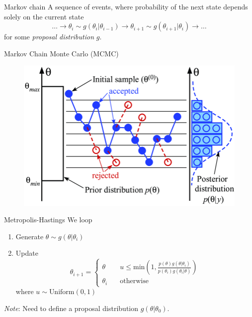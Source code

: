 \documentclass[
aspectratio=169,
14pt,
professionalfonts
]{beamer}
\begin{document}
\begin{frame}{Markov chain}
    A sequence of events, where probability of the next state depends solely on the current state
    $$
    \ldots \to \theta_{i} \sim g(\theta_{i} | \theta_{i-1}) \to \theta_{i+1} \sim g(\theta_{i+1} | \theta_{i}) \to \ldots
    $$
    for some \textit{proposal distribution} $g$. 
\end{frame}

\begin{frame}{Markov Chain Monte Carlo (MCMC)}
    \begin{figure}
        \centering
        \includegraphics[width=0.6\linewidth]{../plots/mcmc_diagram.png}
    \end{figure}
\end{frame}

\begin{frame}{Metropolis-Hastings}
We loop
\begin{enumerate}
    \item Generate $\theta \sim g(\theta|\theta_i)$
    \item Update
    \begin{equation*}
        \theta_{i+1} =
        \begin{cases}
            \theta  &\quad u \leq \text{min}\left(1, \frac{p(\theta)g(\theta|\theta_i)}{p(\theta_i)g(\theta_i|\theta)}\right)\\
            \theta_i &\quad \text{otherwise}
        \end{cases}
    \end{equation*}
    where $u \sim \text{Uniform}(0, 1)$
\end{enumerate}
\textit{Note}: Need to define a proposal distribution $g(\theta|\theta_0)$.
\end{frame}
\end{document}
